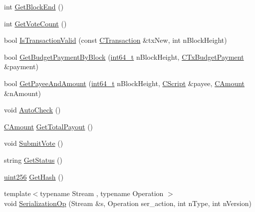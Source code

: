 \begin{DoxyCompactItemize}
\item 
int \hyperlink{class_c_finalized_budget_a45b354d7c3ea65128130cf28e78f4bf4}{Get\+Block\+End} ()
\item 
int \hyperlink{class_c_finalized_budget_a6958b394133bceca95b49c25ce337b06}{Get\+Vote\+Count} ()
\item 
bool \hyperlink{class_c_finalized_budget_a32c98c7a24100e099093e7d33b9330f2}{Is\+Transaction\+Valid} (const \hyperlink{class_c_transaction}{C\+Transaction} \&tx\+New, int n\+Block\+Height)
\item 
bool \hyperlink{class_c_finalized_budget_aa5ec8ed8c03ce6bbc1c49edd942501c8}{Get\+Budget\+Payment\+By\+Block} (\hyperlink{stdint_8h_adec1df1b8b51cb32b77e5b86fff46471}{int64\+\_\+t} n\+Block\+Height, \hyperlink{class_c_tx_budget_payment}{C\+Tx\+Budget\+Payment} \&payment)
\item 
bool \hyperlink{class_c_finalized_budget_a75c6ae33fd0079e732e1103d29501d01}{Get\+Payee\+And\+Amount} (\hyperlink{stdint_8h_adec1df1b8b51cb32b77e5b86fff46471}{int64\+\_\+t} n\+Block\+Height, \hyperlink{class_c_script}{C\+Script} \&payee, \hyperlink{amount_8h_a4eaf3a5239714d8c45b851527f7cb564}{C\+Amount} \&n\+Amount)
\item 
void \hyperlink{class_c_finalized_budget_a88614fdccb5cdf722403c11832df2ad0}{Auto\+Check} ()
\item 
\hyperlink{amount_8h_a4eaf3a5239714d8c45b851527f7cb564}{C\+Amount} \hyperlink{class_c_finalized_budget_a20f2cdac9403d59688b527a98474cc7a}{Get\+Total\+Payout} ()
\item 
void \hyperlink{class_c_finalized_budget_a8d5710eaf0fe541dcdce1d5f2ebee51c}{Submit\+Vote} ()
\item 
string \hyperlink{class_c_finalized_budget_a9a6fbb2d494342fb6d1c48a98d7cc856}{Get\+Status} ()
\item 
\hyperlink{classuint256}{uint256} \hyperlink{class_c_finalized_budget_a0ce6295086247f5982f93ee3cea956e6}{Get\+Hash} ()
\item 
{\footnotesize template$<$typename Stream , typename Operation $>$ }\\void \hyperlink{class_c_finalized_budget_a1bbf758b27a7fb175e2889290f5ef78f}{Serialization\+Op} (Stream \&s, Operation ser\+\_\+action, int n\+Type, int n\+Version)
\end{DoxyCompactItemize}
